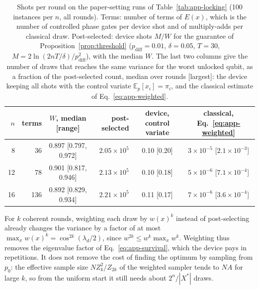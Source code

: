 \begin{table}[ht]
\centering
\small
\caption{Shots per round on the paper-setting runs of Table~\ref{tab:app-locking} (100 instances per $n$, all rounds). Terms: number of terms of $E(x)$, which is the number of controlled phase gates per device shot and of multiply-adds per classical draw. Post-selected: device shots $M/W$ for the guarantee of Proposition~\ref{prop:threshold} ($p_{\mathrm{diff}}=0.01$, $\delta=0.05$, $T=30$, $M=2\ln(2nT/\delta)/p_{\mathrm{diff}}^2$), with the median $W$. The last two columns give the number of draws that reaches the same variance for the worst unlocked qubit, as a fraction of the post-selected count, median over rounds [largest]: the device keeping all shots with the control variate $\mathbb{E}_p[x_i]=\pi_i$, and the classical estimate of Eq.~\eqref{eq:app-weighted}.}
\label{tab:app-shots}
\begin{tabular}{rrcrcc}
\toprule
$n$ & terms & $W$, median [range] & post-selected & device, control variate & classical, Eq.~\eqref{eq:app-weighted} \\
\midrule
8 & 36 & 0.897 [0.797, 0.972] & $2.05\times10^5$ & 0.10 [0.20] & $3\times10^{-5}$ [$2.1\times10^{-3}$] \\
12 & 78 & 0.901 [0.817, 0.946] & $2.13\times10^5$ & 0.10 [0.18] & $5\times10^{-6}$ [$7.1\times10^{-4}$] \\
16 & 136 & 0.892 [0.829, 0.934] & $2.21\times10^5$ & 0.11 [0.17] & $7\times10^{-6}$ [$3.6\times10^{-4}$] \\
\bottomrule
\end{tabular}
\end{table}

For $k$ coherent rounds, weighting each draw by $w(x)^k$ instead of post-selecting already changes the variance by a factor of at most $\max_xw(x)^k=\cos^{2k}(\lambda_d/2)$, since $w^{2k}\le w^k\max_xw^k$. Weighting thus removes the eigenvalue factor of Eq.~\eqref{eq:app-survival}, which the device pays in repetitions. It does not remove the cost of finding the optimum by sampling from $p_0$: the effective sample size $NZ_k^2/Z_{2k}$ of the weighted sampler tends to $NA$ for large $k$, so from the uniform start it still needs about $2^n/|X^*|$ draws.

